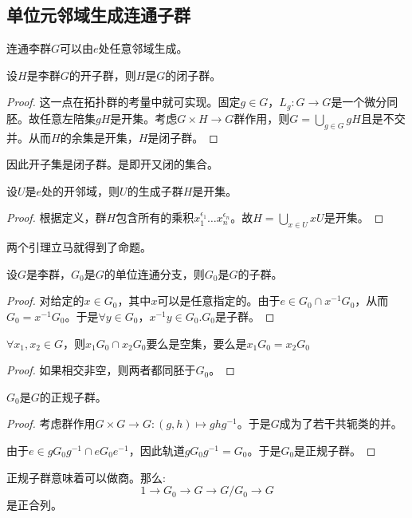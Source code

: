 \subsection{单位元邻域生成连通子群}
\begin{proposition}
    
连通李群$G$可以由$e$处任意邻域生成。
\end{proposition}
\begin{lemma}
    设$H$是李群$G$的开子群，则$H$是$G$的闭子群。
\end{lemma}
\begin{proof}
    这一点在拓扑群的考量中就可实现。固定$g \in G$，$L_g:G \to G$是一个微分同胚。故任意左陪集$gH$是开集。考虑$G \times H \to G$群作用，则$G=\bigcup_{g \in G}gH$且是不交并。从而$H$的余集是开集，$H$是闭子群。
\end{proof}
因此开子集是闭子群。是即开又闭的集合。
\begin{lemma}
    设$U$是$e$处的开邻域，则$U$的生成子群$H$是开集。
\end{lemma}
\begin{proof}
    根据定义，群$H$包含所有的乘积$x_1^{\epsilon_1}\dots x_n^{\epsilon_n}$。故$H=\bigcup_{x \in U}xU$是开集。
\end{proof}
两个引理立马就得到了命题。
\begin{proposition}
    设$G$是李群，$G_0$是$G$的单位连通分支，则$G_0$是$G$的子群。
\end{proposition}
\begin{proof}
    对给定的$x \in G_0$，其中$x$可以是任意指定的。由于$e \in G_0 \cap x^{-1}G_0$，从而$G_0=x^{-1}G_0$。于是$\forall y\in G_0$，$x^{-1}y \in G_0$.$G_0$是子群。
\end{proof}
\begin{corollary}
    $\forall x_1,x_2 \in G$，则$x_1G_0 \cap x_2G_0$要么是空集，要么是$x_1G_0=x_2G_0$
\end{corollary}
\begin{proof}
    如果相交非空，则两者都同胚于$G_0$。
\end{proof}
\begin{corollary}
    $G_0$是$G$的正规子群。
\end{corollary}
\begin{proof}
    考虑群作用$G\times G \to G:(g,h)\mapsto ghg^{-1}$。于是$G$成为了若干共轭类的并。

    由于$e \in gG_0g^{-1} \cap eG_0 e^{-1}$，因此轨道$gG_0g^{-1}=G_0$。于是$G_0$是正规子群。
\end{proof}
正规子群意味着可以做商。那么:
$$
1 \to G_0 \to G \to G/G_0 \to G
$$
是正合列。

